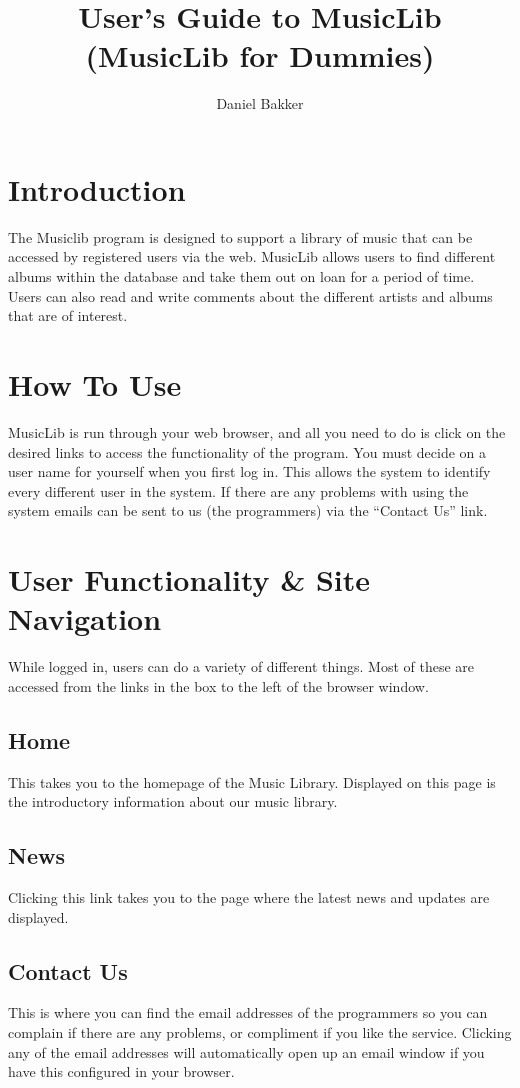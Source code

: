 \documentclass{article}
\title{User's Guide to MusicLib (MusicLib for Dummies)}
\author{Daniel Bakker}
\begin{document}
\maketitle
\tableofcontents

\section{Introduction}
The Musiclib program is designed to support a library of music that can be accessed by registered users via the web. MusicLib allows users to find different albums within the database and take them out on loan for a period of time. Users can also read and write comments about the different artists and albums that are of interest.

\section{How To Use}
MusicLib is run through your web browser, and all you need to do is click on the desired links to access the functionality of the program. You must decide on a user name for yourself when you first log in. This allows the system to identify every different user in the system. If there are any problems with using the system emails can be sent to us (the programmers) via the ``Contact Us'' link.  

\section{User Functionality \& Site Navigation}
While logged in, users can do a variety of different things. Most of these are accessed from the links in the box to the left of the browser window.
\subsection{Home}
This takes you to the homepage of the Music Library. Displayed on this page is the introductory information about our music library.
\subsection{News}
Clicking this link takes you to the page where the latest news and updates are displayed.
\subsection{Contact Us}
This is where you can find the email addresses of the programmers so you can complain if there are any problems, or compliment if you like the service. Clicking any of the email addresses will automatically open up an email window if you have this configured in your browser.
\end{document}
